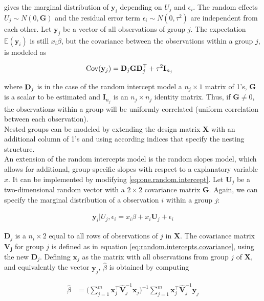 \documentclass[11pt,a4paper,twoside]{book}\usepackage[]{graphicx}\usepackage[]{color}
\begin{document}
gives the marginal distribution of $\mathbf{y}_i$ depending on $U{_j}$ and $\epsilon_i$. The random effects $U_j \sim N(0, \mathbf{G})$ and the residual error term $\epsilon_i \sim N(0, \tau^{2})$ are independent from each other. Let $\mathbf{y}_j$ be a vector of all observations of group $j$. The expectation $\mathbb{E}(\mathbf{y}_i)$ is still $x_i \beta$, but the covariance between the observations within a group $j$, is modeled as

\begin{align}
\operatorname{Cov}(\mathbf{y}_j) &= \mathbf{D}_j \mathbf{G} \mathbf{D}_j^\top + \tau^2 \mathbf{I}_{n_j} \label{eq:random.intercepts.covariance}
\end{align}

where ${\mathbf{D}}_j$ is in the case of the random intercept model a $n_j \times 1$ matrix of 1's, $\mathbf{G}$ is a scalar to be estimated and $\mathbf{I}_{n_j}$ is an $n_j \times n_j$ identity matrix. Thus, if $\mathbf{G} \neq 0$, the observations within a group will be uniformly correlated (uniform correlation between each observation). \\
Nested groups can be modeled by extending the design matrix $\mathbf{X}$ with an additional column of 1's and using according indices that specify the nesting structure.\\
An extension of the random intercepts model is the random slopes model, which allows for additional, group-specific slopes with respect to a explanatory variable $x$. It can be implemented by modifying \eqref{eq:one.random.intercept}. Let $\mathbf{U}_j$ be a two-dimensional random vector with a $2 \times 2$ covariance matrix $\mathbf{G}$. Again, we can specify the marginal distribution of a observation $i$ within a group $j$:

\begin{align}
\mathbf{y}_i|U_j,\epsilon_i =  x_i\beta + x_i \mathbf{U}_j + \epsilon_i \label{eq:one.random.intercept.and.slope}
\end{align}

$\mathbf{D}_j$ is a $n_i \times 2$ equal to all rows of observations of $j$ in $\mathbf{X}$. The covariance matrix $\mathbf{V_j}$ for group $j$ is defined as in equation \eqref{eq:random.intercepts.covariance}, using the new $\mathbf{D}_j$. Defining $\mathbf{x}_j$ as the matrix with all observations from group $j$ of $\mathbf{X}$, and equivalently the vector $\mathbf{y}_j$, $\hat{\beta}$ is obtained by computing

\begin{align}
\hat{\beta} &= \Big( \sum_{j = 1}^m \mathbf{x}_j^\top \hat{\mathbf{V}}_j^{-1} \mathbf{x}_j \Big)^{-1} \sum_{j = 1}^m \mathbf{x}_j^\top \hat{\mathbf{V}}_j^{-1} \mathbf{y}_j
\end{align}
\end{document}
